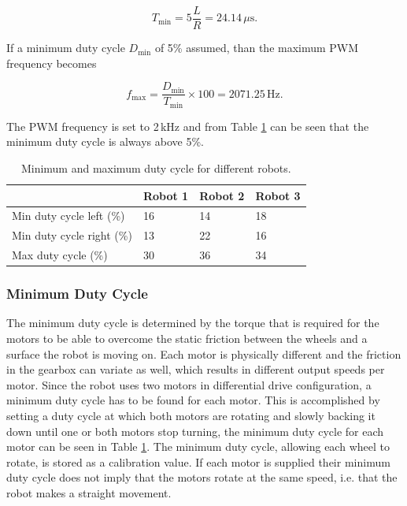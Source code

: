 \begin{equation}
T_{\min} = 5 \frac{L}{R} = 24.14\,\mu\text{s}.
\end{equation}

\noindent
If a minimum duty cycle $D_{\min}$ of 5\% assumed, than the maximum PWM frequency becomes

\begin{equation}
f_{\max} = \frac{D_{\min}}{T_{\min}}\times 100 = 2071.25\,\text{Hz}.
\end{equation}

\noindent
The PWM frequency is set to 2\,kHz and from Table \ref{tab:duty_cycle} can be seen that the minimum duty cycle is always above 5\%.

\begin{table}[t]
	\centering
	\caption{Minimum and maximum duty cycle for different robots.}
	\label{tab:duty_cycle}
	\begin{tabular}{|l||l|l|l|} 
		\hline
						          & Robot 1 & Robot 2 & Robot 3 \\
		\hline \hline
 		Min duty cycle left (\%)  & 16      & 14      & 18      \\
		Min duty cycle right (\%) & 13      & 22      & 16      \\
		Max duty cycle (\%)       & 30      & 36      & 34	    \\
		\hline
	\end{tabular}
\end{table}

\subsubsection{Minimum Duty Cycle}

The minimum duty cycle is determined by the torque that is required for the motors to be able to overcome the static friction between the wheels and a surface the robot is moving on.
Each motor is physically different and the friction in the gearbox can variate as well, which results in different output speeds per motor.
Since the robot uses two motors in differential drive configuration, a minimum duty cycle has to be found for each motor.
This is accomplished by setting a duty cycle at which both motors are rotating and slowly backing it down until one or both motors stop turning, the minimum duty cycle for each motor can be seen in Table \ref{tab:duty_cycle}.
The minimum duty cycle, allowing each wheel to rotate, is stored as a calibration value.
If each motor is supplied their minimum duty cycle does not imply that the motors rotate at the same speed, i.e. that the robot makes a straight movement.

